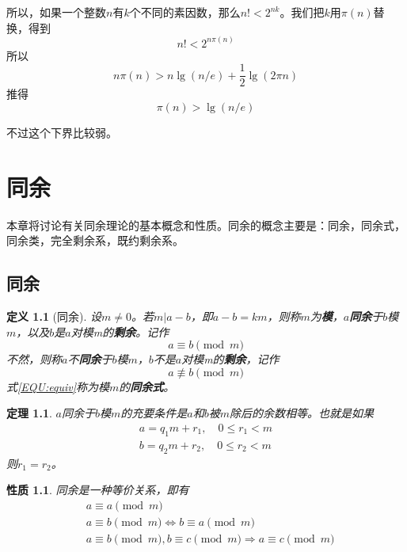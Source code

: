 \documentclass{ctexrep}
\newcommand{\bbold}[1]{\textbf{#1}}
\newtheorem{thrm}{定理}[section]
\newtheorem{prop}{性质}[section]
\newtheorem{defn}{定义}[section]
\begin{document}
所以，如果一个整数$n$有$k$个不同的素因数，那么$n!<2^{nk}$。我们把$k$用$\pi(n)$替换，得到
\begin{displaymath}
n!<2^{n\pi(n)}
\end{displaymath}
所以
\begin{displaymath}
n\pi(n)>n\lg(n/e)+\frac{1}{2}\lg(2\pi n)
\end{displaymath}
推得
\begin{displaymath}
\pi(n)>\lg(n/e)
\end{displaymath}

不过这个下界比较弱。


\chapter{同余}
本章将讨论有关同余理论的基本概念和性质。同余的概念主要是：同余，同余式，同余类，完全剩余系，既约剩余系。

\section{同余}

\begin{defn}[同余]
设$m\neq 0$。若$m|a-b$，即$a-b=km$，则称$m$为\bbold{模}，$a$\bbold{同余}于$b$模$m$，以及$b$是$a$对模m的\bbold{剩余}。记作
\begin{equation}\label{EQU:equiv}
a\equiv b\pmod{m}
\end{equation}
不然，则称$a$不\bbold{同余}于$b$模$m$，$b$不是$a$对模m的\bbold{剩余}，记作
\begin{displaymath}
a\not\equiv b\pmod{m}
\end{displaymath}
式\ref{EQU:equiv}称为模$m$的\bbold{同余式}。
\end{defn}

\begin{thrm}
$a$同余于$b$模$m$的充要条件是$a$和$b$被$m$除后的余数相等。也就是如果
\begin{eqnarray*}
a=q_1 m+r_1,\quad 0\leq r_1<m \\
b=q_2 m+r_2,\quad 0\leq r_2<m
\end{eqnarray*}
则$r_1=r_2$。
\end{thrm}

\begin{prop}
同余是一种等价关系，即有
\begin{eqnarray*}
&a\equiv a\pmod{m}\\
&a\equiv b\pmod{m} \iff b\equiv a\pmod{m} \\
&a\equiv b\pmod{m}, b \equiv c\pmod{m} \Rightarrow a\equiv c\pmod{m}
\end{eqnarray*}
\end{prop}
\end{document}
